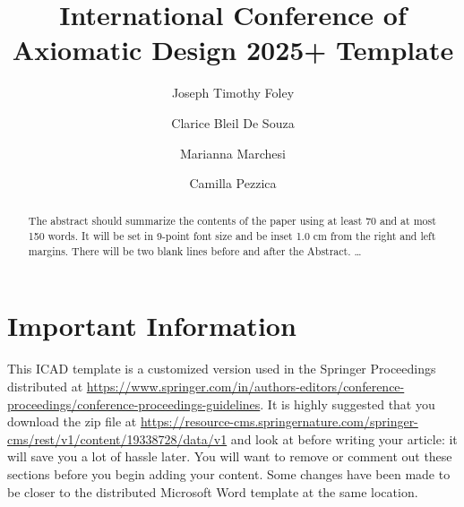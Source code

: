 \documentclass{svproc}
\begin{document}
\title{International Conference of Axiomatic Design 2025+ Template}


\author{Joseph Timothy Foley \and Clarice Bleil De Souza
  \and Marianna Marchesi \and Camilla Pezzica}


\maketitle              %

\begin{abstract}
The abstract should summarize the contents of the paper
using at least 70 and at most 150 words. It will be set in 9-point
font size and be inset 1.0 cm from the right and left margins.
There will be two blank lines before and after the Abstract. \dots
\end{abstract}

\section*{Important Information}\label{sec:important-info}
This ICAD template is a customized version used in the Springer Proceedings distributed at \url{https://www.springer.com/in/authors-editors/conference-proceedings/conference-proceedings-guidelines}.
It is highly suggested that you download the zip file at \url{https://resource-cms.springernature.com/springer-cms/rest/v1/content/19338728/data/v1} and look at  before writing your article:  it will save you a lot of hassle later.
You will want to remove or comment out these sections before you begin adding your content.
Some changes have been made to be closer to the distributed Microsoft Word template at the same location.
\end{document}
